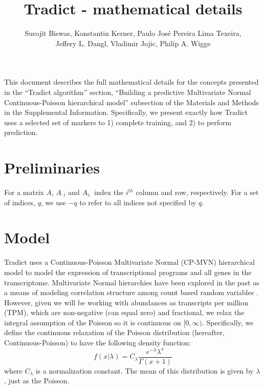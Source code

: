 \documentclass[10pt]{article}
\author{Surojit Biswas, Konstantin Kerner, Paulo Jos\'{e} Pereira Lima Texeira, \\ Jeffery L. Dangl, Vladimir Jojic, Philip A. Wigge}
\date{}
\title{Tradict - mathematical details}
\begin{document}
\maketitle

\tableofcontents
\vspace{10mm}

This document describes the full mathematical details for the concepts presented in the ``Tradict algorithm'' section, ``Building a predictive Multivariate Normal Continuous-Poisson hierarchical model''  subsection of the Materials and Methods in the Supplemental Information. Specifically, we present exactly how Tradict uses a selected set of markers to 1) complete training, and 2) to perform prediction. 

\section{Preliminaries} \label{prelim}

For a matrix $A$, $A_{:i}$ and $A_{i:}$ index the $i^{th}$ column and row, respectively. For a set of indices, $q$, we use $-q$ to refer to all indices not specified by $q$. 

\section{Model} \label{model}

Tradict uses a Continuous-Poisson Multivariate Normal (CP-MVN) hierarchical model to model the expression of transcriptional programs and all genes in the transcriptome. Multivariate Normal hierarchies have been explored in the past as a means of modeling correlation structure among count based random variables \cite{Ho1989,Madsen2007,Wu2016,Biswas2015}. However, given we will be working with abundances as transcripts per million (TPM), which are non-negative (can equal zero) and fractional, we  relax the integral assumption of the Poisson so it is continuous on $[0, \infty)$.   Specifically, we define the continuous relaxation of the Poisson distribution (hereafter, Continuous-Poisson) to have the following density function:
\[
f(x|\lambda) = C_\lambda \frac{e^{-\lambda} \lambda^x}{\Gamma(x + 1)}
\]
where $C_\lambda$ is a normalization constant. The mean of this distribution is given by $\lambda$, just as the Poisson.
\end{document}
